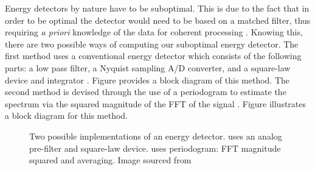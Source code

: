 Energy detectors by nature have to be suboptimal.  This is due to the fact that in order to be optimal the detector would need to be based on a matched filter, thus requiring \textit{a priori} knowledge of the data for coherent processing \cite{CabTkaBro06}.  Knowing this, there are two possible ways of computing our suboptimal energy detector.  The first method uses a conventional energy detector which consists of the following parts: a low pass filter, a Nyquist sampling A/D converter, and a square-law device and integrator \cite{CabTkaBro06}.  Figure  provides a block diagram of this method.  The second method is devised through the use of a periodogram to estimate the spectrum via the squared magnitude of the FFT of the signal \cite{CabTkaBro06}.  Figure  illustrates a block diagram for this method.

\begin{figure} [ht]
\centering
\caption{Two possible implementations of an energy detector.   uses an analog pre-filter and square-law device.   uses periodogram: FFT magnitude squared and averaging. Image sourced from \cite{CabTkaBro06}}
\label{fig:energy_detect}
\end{figure}

